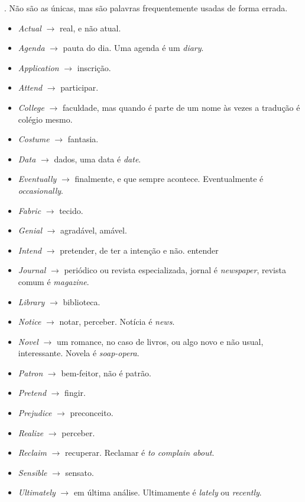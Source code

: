 \documentclass[openany]{book}
\begin{document}
. Não são as únicas, mas são palavras frequentemente usadas de forma errada.
\begin{itemize}
    \item \textit{Actual} $\rightarrow$ real, e não atual.
    \item \textit{Agenda} $\rightarrow$ pauta do dia. Uma agenda é um \textit{diary}.
    \item \textit{Application} $\rightarrow$ inscrição.
    \item \textit{Attend} $\rightarrow$ participar.
    \item \textit{College} $\rightarrow$ faculdade, mas quando é parte de um nome às vezes a tradução é colégio mesmo.
    \item \textit{Costume} $\rightarrow$ fantasia.
    \item \textit{Data} $\rightarrow$ dados, uma data é \textit{date}.
    \item \textit{Eventually} $\rightarrow$ finalmente, e que sempre acontece. Eventualmente é \textit{occasionally}.
    \item \textit{Fabric} $\rightarrow$ tecido.
    \item \textit{Genial} $\rightarrow$ agradável, amável.
    \item \textit{Intend} $\rightarrow$ pretender, de ter a intenção e não. entender
    \item \textit{Journal} $\rightarrow$ periódico ou revista especializada, jornal é \textit{newspaper}, revista comum é \textit{magazine}.
    \item \textit{Library} $\rightarrow$ biblioteca.
    \item \textit{Notice} $\rightarrow$ notar, perceber. Notícia é \textit{news}.
    \item \textit{Novel} $\rightarrow$ um romance, no caso de livros, ou algo novo e não usual, interessante. Novela é \textit{soap-opera}.
    \item \textit{Patron} $\rightarrow$ bem-feitor, não é patrão.
    \item \textit{Pretend} $\rightarrow$ fingir.
    \item \textit{Prejudice} $\rightarrow$ preconceito.
    \item \textit{Realize} $\rightarrow$ perceber.
    \item \textit{Reclaim} $\rightarrow$ recuperar. Reclamar é \textit{to complain about}.
    \item \textit{Sensible} $\rightarrow$ sensato.
    \item \textit{Ultimately} $\rightarrow$ em última análise. Ultimamente é \textit{lately} ou \textit{recently}.
    \end{itemize}
\end{document}

